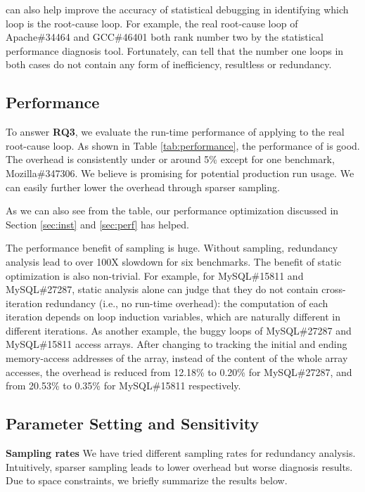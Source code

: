 \Tool can also help improve the accuracy of statistical debugging in
identifying which loop is the root-cause loop.
For example, the real root-cause loop of Apache\#34464 and GCC\#46401 both
rank number two by the statistical performance diagnosis tool.
Fortunately,
\Tool can tell that the number one loops in both cases do not contain
any form of inefficiency, resultless or redundancy. 

\subsection{Performance}
\label{sec:result_perf}



{\color{red}
To answer \textbf{RQ3}, we evaluate the run-time performance of
applying \Tool to the real root-cause loop. 
}
As shown in Table \ref{tab:performance}, 
the performance of \Tool is good. The overhead is consistently under or around 5\% 
except for one benchmark, Mozilla\#347306. 
We believe \Tool is promising for potential production
run usage.
We can easily further lower the overhead through sparser sampling.

As we can also see from the table, our performance optimization discussed in 
Section \ref{sec:inst} and \ref{sec:perf} has helped.

The performance benefit of sampling is huge.
Without sampling, redundancy
analysis lead to over 100X slowdown for six benchmarks.
The benefit of static optimization is also non-trivial. 
For example, for MySQL\#15811 and MySQL\#27287, static analysis alone can
judge that they do not contain cross-iteration redundancy (i.e., no run-time 
overhead): the computation of 
each iteration depends on loop induction variables, which are naturally different
in different iterations. 
As another example, the buggy loops of MySQL\#27287 and MySQL\#15811 access 
arrays. 
After changing to tracking the initial and ending memory-access addresses
of the array, instead of the content of the whole array accesses,
the overhead is reduced from 12.18\% to 0.20\% for MySQL\#27287, 
and from 20.53\% to 0.35\% for MySQL\#15811 respectively. 

\subsection{Parameter Setting and Sensitivity}
\label{sec:sensi}
\noindent\textbf{Sampling rates}
We have tried different sampling rates for redundancy analysis.
Intuitively, sparser sampling leads to lower overhead but worse diagnosis
results. Due to space constraints, we briefly summarize the results below.


